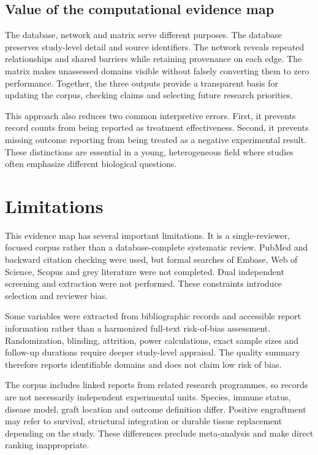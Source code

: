 \documentclass[11pt,a4paper]{article}
\begin{document}
\subsection{Value of the computational evidence map}

The database, network and matrix serve different purposes. The database preserves study-level detail and source identifiers. The network reveals repeated relationships and shared barriers while retaining provenance on each edge. The matrix makes unassessed domains visible without falsely converting them to zero performance. Together, the three outputs provide a transparent basis for updating the corpus, checking claims and selecting future research priorities.

This approach also reduces two common interpretive errors. First, it prevents record counts from being reported as treatment effectiveness. Second, it prevents missing outcome reporting from being treated as a negative experimental result. These distinctions are essential in a young, heterogeneous field where studies often emphasize different biological questions.

\section{Limitations}

This evidence map has several important limitations. It is a single-reviewer, focused corpus rather than a database-complete systematic review. PubMed and backward citation checking were used, but formal searches of Embase, Web of Science, Scopus and grey literature were not completed. Dual independent screening and extraction were not performed. These constraints introduce selection and reviewer bias.

Some variables were extracted from bibliographic records and accessible report information rather than a harmonized full-text risk-of-bias assessment. Randomization, blinding, attrition, power calculations, exact sample sizes and follow-up durations require deeper study-level appraisal. The quality summary therefore reports identifiable domains and does not claim low risk of bias.

The corpus includes linked reports from related research programmes, so records are not necessarily independent experimental units. Species, immune status, disease model, graft location and outcome definition differ. Positive engraftment may refer to survival, structural integration or durable tissue replacement depending on the study. These differences preclude meta-analysis and make direct ranking inappropriate.
\end{document}
